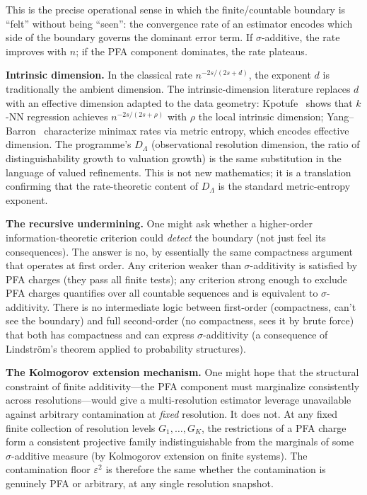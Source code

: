 This is the precise operational sense in which the finite/countable
boundary is ``felt'' without being ``seen'': the convergence rate of
an estimator encodes which side of the boundary governs the
dominant error term.  If $\sigma$-additive, the rate improves with
$n$; if the PFA component dominates, the rate plateaus.

\medskip\noindent
\textbf{Intrinsic dimension.}  In the classical rate
$n^{-2s/(2s+d)}$, the exponent $d$ is traditionally the ambient
dimension.  The intrinsic-dimension literature replaces $d$ with an
effective dimension adapted to the data geometry: Kpotufe~\cite{Kpotufe2011} shows that $k$-NN
regression achieves $n^{-2s/(2s+\rho)}$ with $\rho$ the local
intrinsic dimension; Yang--Barron~\cite{YangBarron1999}
characterize minimax rates via metric entropy, which encodes
effective dimension.  The programme's $D_\Lambda$ (observational
resolution dimension, the ratio of distinguishability growth to
valuation growth) is the same substitution in the language of valued
refinements.  This is not new mathematics; it is a translation
confirming that the rate-theoretic content of $D_\Lambda$ is the
standard metric-entropy exponent.

\medskip\noindent
\textbf{The recursive undermining.}  One might ask whether a
higher-order information-theoretic criterion could \emph{detect} the
boundary (not just feel its consequences).  The answer is no, by
essentially the same compactness argument that operates at first
order.  Any criterion weaker than $\sigma$-additivity is satisfied
by PFA charges (they pass all finite tests); any criterion strong
enough to exclude PFA charges quantifies over all countable
sequences and is equivalent to $\sigma$-additivity.  There is no
intermediate logic between first-order (compactness, can't see the
boundary) and full second-order (no compactness, sees it by brute
force) that both has compactness and can express $\sigma$-additivity
(a consequence of Lindstr\"{o}m's theorem applied to probability
structures).

\medskip\noindent
\textbf{The Kolmogorov extension mechanism.}  One might hope that
the structural constraint of finite additivity---the PFA component
must marginalize consistently across resolutions---would give a
multi-resolution estimator leverage unavailable against arbitrary
contamination at \emph{fixed} resolution.  It does not.  At any
fixed finite collection of resolution levels $G_1,\ldots,G_K$, the
restrictions of a PFA charge form a consistent projective family
indistinguishable from the marginals of some $\sigma$-additive measure
(by Kolmogorov extension on finite systems).  The contamination
floor $\varepsilon^2$ is therefore the same whether the contamination
is genuinely PFA or arbitrary, at any single resolution snapshot.

